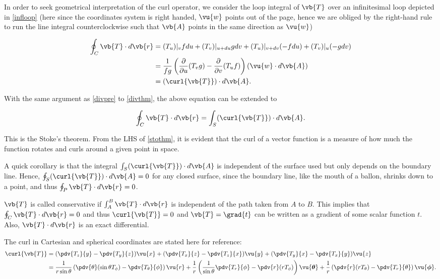 \documentclass[english,a4paper,12pt]{report}
\begin{document}
In order to seek geometrical interpretation of the curl operator, we consider the loop integral of \(\vb{T}\) over an infinitesimal loop depicted in \cref{infloop} (here since the coordinates system is right handed, \(\vu{w}\) points out of the page, hence we are obliged by the right-hand rule to run the line integral counterclockwise such that \(\vb{A}\) points in the same direction as \(\vu{w}\))
	
\begin{equation} 
	\begin{aligned} 
		\oint_{C} \vb{T} \cdot d\vb{r} &= (T_u)|_{v}fdu + (T_v)|_{u+du}gdv + (T_u)|_{v+dv}(-fdu) + (T_v)|_{u}(-gdv) \\ &= \frac{1}{fg}\left(\frac{\partial }{\partial u} (T_{v} g) - \frac{\partial }{\partial v} (T_{u}f)\right)(\vu{w} \cdot d\vb{A}) \\ &= (\curl{\vb{T} } ) \cdot d\vb{A} . 
	\end{aligned} 
\end{equation}

With the same argument as \cref{divpre}  to \cref{divthm}, the above equation can be extended to
	
\begin{equation} 
	\oint_{C} \vb{T} \cdot d\vb{r} = \int_{S} (\curl{\vb{T}}) \cdot d\vb{A}. \label{stothm} 
\end{equation}
	
This is the Stoke's theorem. From the LHS of \cref{stothm}, it is evident that the curl of a vector function is a measure of how much the function rotates and curls around a given point in space.
	
A quick corollary is that the integral \(\int_{S} (\curl{\vb{T}}) \cdot d\vb{A}\) is independent of the surface used but only depends on the boundary line. Hence, \(\oint_{S} (\curl{\vb{T}}) \cdot d\vb{A} = 0\) for any closed surface, since the boundary line, like the mouth of a ballon, shrinks down to a point, and thus \(\oint_{P} \vb{T} \cdot d\vb{r} = 0\).

\(\vb{T} \) is called conservative if \(\int_{A}^{B}  \vb{T} \cdot d\vb{r}  \) is independent of the path taken from \(A\) to \(B\). This implies that \(\oint_{C} \vb{T} \cdot d\vb{r} = 0\) and thus \(\curl{\vb{T} } = 0\) and \(\vb{T} = \grad{t} \) can be written as a gradient of some scalar function \(t\). Also, \(\vb{T} \cdot d\vb{r} \) is an exact differential.      

The curl in Cartesian and spherical coordinates are stated here for reference:
\begin{equation} 
	\begin{aligned}
	\curl{\vb{T}} &= (\pdv{T_z}{y} - \pdv{T_y}{z})\vu{x} + (\pdv{T_x}{z} - \pdv{T_z}{x})\vu{y} + (\pdv{T_y}{x} - \pdv{T_x}{y})\vu{z} \\ &= \frac{1}{r\sin{\theta}}\left(\pdv{\theta}(\sin{\theta}T_{\phi}) - \pdv{T_{\theta}}{\phi}\right)\vu{r} + \frac{1}{r}\left(\frac{1}{\sin{\theta}}\pdv{T_r}{\phi} - \pdv{r}(rT_{\phi})\right)\vu{\boldsymbol{\theta } } + \frac{1}{r}\left(\pdv{r}(rT_{\theta}) - \pdv{T_r}{\theta}\right)\vu{\boldsymbol{\phi } }. 
    \end{aligned}
\end{equation}
	
\end{document}
